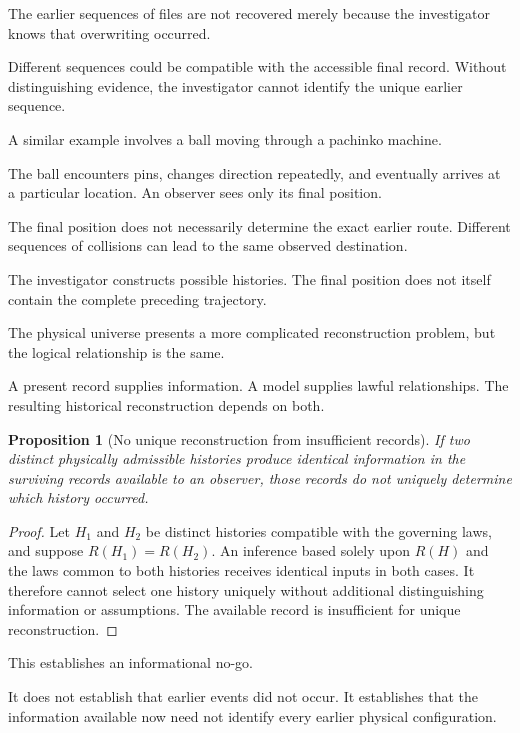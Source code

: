 \documentclass[12pt,onecolumn]{article}
\newtheorem{proposition}{Proposition}[section]
\begin{document}
The earlier sequences of files are not recovered merely because the investigator knows that overwriting occurred.

Different sequences could be compatible with the accessible final record. Without distinguishing evidence, the investigator cannot identify the unique earlier sequence.

A similar example involves a ball moving through a pachinko machine.

The ball encounters pins, changes direction repeatedly, and eventually arrives at a particular location. An observer sees only its final position.

The final position does not necessarily determine the exact earlier route. Different sequences of collisions can lead to the same observed destination.

The investigator constructs possible histories. The final position does not itself contain the complete preceding trajectory.

The physical universe presents a more complicated reconstruction problem, but the logical relationship is the same.

A present record supplies information. A model supplies lawful relationships. The resulting historical reconstruction depends on both.

\begin{proposition}[No unique reconstruction from insufficient records]

If two distinct physically admissible histories produce identical information in the surviving records available to an observer, those records do not uniquely determine which history occurred.

\end{proposition}

\begin{proof}

Let \(H_1\) and \(H_2\) be distinct histories compatible with the governing laws, and suppose \(R(H_1)=R(H_2)\). An inference based solely upon \(R(H)\) and the laws common to both histories receives identical inputs in both cases. It therefore cannot select one history uniquely without additional distinguishing information or assumptions. The available record is insufficient for unique reconstruction.

\end{proof}

This establishes an informational no-go.

It does not establish that earlier events did not occur. It establishes that the information available now need not identify every earlier physical configuration.
\end{document}
